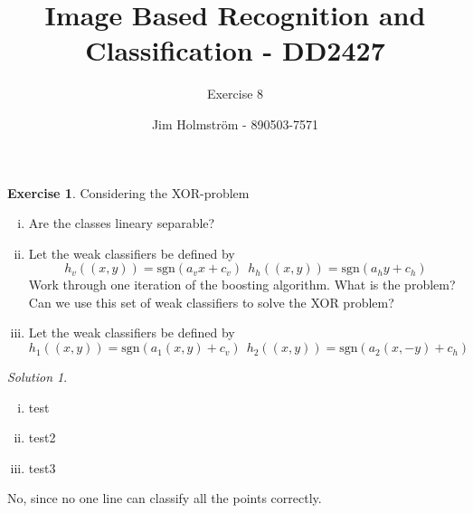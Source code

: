 \documentclass[a4paper,twoside=false,abstract=false,numbers=noenddot,
titlepage=false,headings=small,parskip=half,version=last]{scrartcl}
\author{Jim Holmström - 890503-7571}
\title{Image Based Recognition and Classification - DD2427}
\subtitle{Exercise 8}
\theoremstyle{definition}
\newtheorem{exercise}{Exercise}
\theoremstyle{remark}
\newtheorem*{solution}{Solution}
\begin{document}
\maketitle
\thispagestyle{empty}

\begin{exercise}
Considering the XOR-problem
\begin{enumerate}[i)]
    \item Are the classes lineary separable?
    \item Let the weak classifiers be defined by
        \begin{equation}
            h_v((x,y))=\text{sgn}(a_vx+c_v) ~~h_h((x,y))=\text{sgn}(a_hy+c_h)
        \end{equation}
        Work through one iteration of the boosting algorithm. What is the problem? Can we use this set of weak classifiers to solve the XOR problem?
    \item Let the weak classifiers be defined by
        \begin{equation}
            h_1((x,y))=\text{sgn}(a_1(x,y)+c_v) ~~h_2((x,y))=\text{sgn}(a_2(x,-y)+c_h)
        \end{equation}

\end{enumerate}
\end{exercise}
\begin{solution}~\\
\begin{enumerate}[i)]
    \item test
    \item test2
    \item test3
\end{enumerate}

No, since no one line can classify all the points correctly.
\end{solution}
\end{document}
